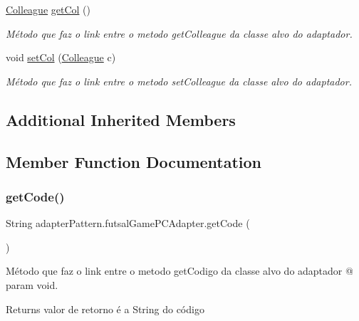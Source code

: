 \begin{DoxyCompactItemize}
\mbox{\hyperlink{classmediator_pattern_1_1_colleague}{Colleague}} \mbox{\hyperlink{classadapter_pattern_1_1futsal_game_p_c_adapter_a5521d22c8ffdcedf28b517679bc19e29}{get\+Col}} ()
\begin{DoxyCompactList}\small\item\em Método que faz o link entre o metodo get\+Colleague da classe alvo do adaptador. \end{DoxyCompactList}\item 
void \mbox{\hyperlink{classadapter_pattern_1_1futsal_game_p_c_adapter_a4a2771736086916d3dc766e417a7913a}{set\+Col}} (\mbox{\hyperlink{classmediator_pattern_1_1_colleague}{Colleague}} c)
\begin{DoxyCompactList}\small\item\em Método que faz o link entre o metodo set\+Colleague da classe alvo do adaptador. \end{DoxyCompactList}\end{DoxyCompactItemize}
\subsection*{Additional Inherited Members}


\subsection{Member Function Documentation}
\mbox{\label{classadapter_pattern_1_1futsal_game_p_c_adapter_ae1919eb69e2f543d9bf537b9244d803e}} 
\subsubsection{\texorpdfstring{getCode()}{getCode()}}
{\footnotesize\ttfamily String adapter\+Pattern.\+futsal\+Game\+P\+C\+Adapter.\+get\+Code (\begin{DoxyParamCaption}{ }\end{DoxyParamCaption})}



Método que faz o link entre o metodo get\+Codigo da classe alvo do adaptador @ param void. 

\begin{DoxyReturn}{Returns}
valor de retorno é a String do código 
\end{DoxyReturn}


